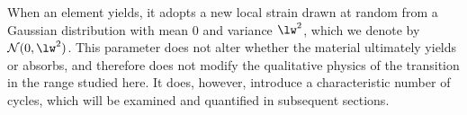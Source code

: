 \documentclass[asymmetricmargins]{library/duthesis}%
\providecommand{\DIFaddend}{} %
\begin{document}
\DIFaddend 

When an element yields, it adopts a new local strain drawn at random from a Gaussian distribution with mean $0$ and variance $\lw^2$, which we denote by $\mathcal{N}(0,\lw^2)$. This parameter does not alter whether the material ultimately yields or absorbs, and therefore does not modify the qualitative physics of the transition in the range studied here. It does, however, introduce a characteristic number of cycles, which will be examined and quantified in subsequent sections. 
\end{document}
